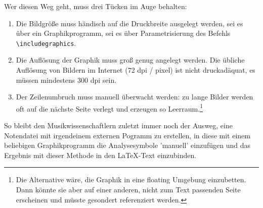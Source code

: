 Wer diesen Weg geht, muss drei Tücken im Auge behalten:
\begin{enumerate}
  \item Die Bildgröße muss händisch auf die Druckbreite ausgelegt werden, sei es über
  ein Graphikprogramm, sei es über Parametrisierung des Befehls
  \texttt{\textbackslash{includegraphics}}.
  \item Die Auflösung der Graphik muss groß genug angelegt werden. Die übliche
  Auflösung von Bildern im Internet (72 dpi / pixel) ist nicht druckadäquat, es
  müssen mindestens 300 dpi sein.
  \item Der Zeilenumbruch muss manuell überwacht werden: zu lange Bilder werden
  oft auf die nächste Seite verlegt und erzeugen so Leerraum.\footnote{Die
  Alternative wäre, die Graphik in eine floating Umgebung einzubetten. Dann
  könnte sie aber auf einer anderen, nicht zum Text passenden Seite erscheinen
  und müsste gesondert referenziert werden.}
\end{enumerate}



So bleibt den Musikwissenschaftlern zuletzt immer noch der Ausweg, eine
Notendatei mit irgendeinem externen Pogramm zu erstellen, in diese mit einem
beliebigen Graphikprogramm die Analysesymbole 'manuell' einzufügen und das
Ergebnis mit dieser Methode in den \LaTeX-Text einzubinden.

% 
